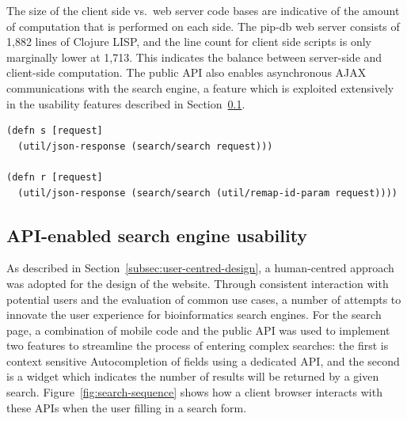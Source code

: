 The size of the client side vs.\ web server code bases are indicative
of the amount of computation that is performed on each side. The
pip-db web server consists of 1,882 lines of Clojure LISP, and the
line count for client side scripts is only marginally lower at
1,713. This indicates the balance between server-side and client-side
computation. The public API also enables asynchronous AJAX
communications with the search engine, a feature which is exploited
extensively in the usability features described in
Section~\ref{subsec:ux}.\\


\lstset{language=clojure}
\begin{lstlisting}[label=lst:api-handlers,caption={%
      [API ring handler implementations]
       API ring handler implementations, taken from \texttt{api.clj}.}]
(defn s [request]
  (util/json-response (search/search request)))

(defn r [request]
  (util/json-response (search/search (util/remap-id-param request))))
\end{lstlisting}


\subsection{API-enabled search engine usability}\label{subsec:ux}

As described in Section~\ref{subsec:user-centred-design}, a
human-centred approach was adopted for the design of the
website. Through consistent interaction with potential users and the
evaluation of common use cases, a number of attempts to innovate the
user experience for bioinformatics search engines. For the search
page, a combination of mobile code and the public API was used to
implement two features to streamline the process of entering complex
searches: the first is context sensitive Autocompletion of fields
using a dedicated API, and the second is a widget which indicates the
number of results will be returned by a given
search. Figure~\ref{fig:search-sequence} shows how a client browser
interacts with these APIs when the user filling in a search form.


